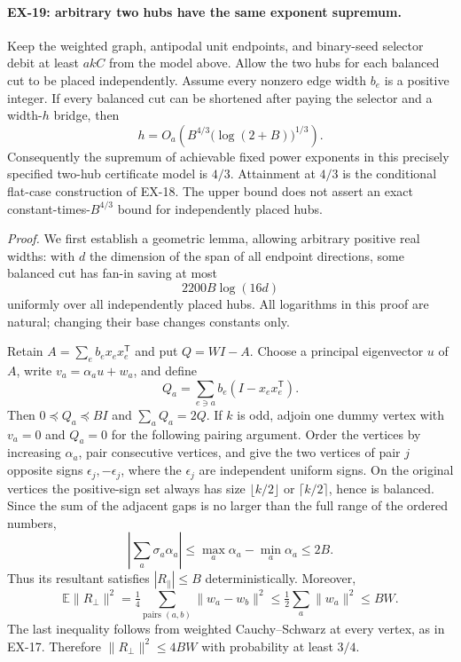 \paragraph{EX-19: arbitrary two hubs have the same exponent supremum.}
Keep the weighted graph, antipodal unit endpoints, and binary-seed selector
debit at least $akC$ from the model above.  Allow the two hubs for each
balanced cut to be placed independently.  Assume every nonzero edge width
$b_e$ is a positive integer.  If every balanced cut can be shortened after
paying the selector and a width-$h$ bridge, then
\[
 h=O_a\!\left(B^{4/3}\bigl(\log(2+B)\bigr)^{1/3}\right).
\]
Consequently the supremum of achievable fixed power exponents in this
precisely specified two-hub certificate model is $4/3$.  Attainment at
$4/3$ is the conditional flat-case construction of EX-18.  The upper bound
does not assert an exact constant-times-$B^{4/3}$ bound for independently
placed hubs.

\emph{Proof.}
We first establish a geometric lemma, allowing arbitrary positive real
widths: with $d$ the dimension of the span of all endpoint directions, some
balanced cut has fan-in saving at most
\[
 2200B\log(16d)
\]
uniformly over all independently placed hubs.  All logarithms in this
proof are natural; changing their base changes constants only.

Retain $A=\sum_e b_ex_ex_e^{\mathsf T}$ and put $Q=WI-A$.
Choose a principal eigenvector $u$ of $A$, write
$v_a=\alpha_a u+w_a$, and define
\[
 Q_a=\sum_{e\ni a}b_e(I-x_ex_e^{\mathsf T}).
\]
Then $0\preceq Q_a\preceq BI$ and $\sum_aQ_a=2Q$.
If $k$ is odd, adjoin one dummy vertex with $v_a=0$ and $Q_a=0$ for the
following pairing argument.  Order the vertices by increasing $\alpha_a$,
pair consecutive vertices, and give the two vertices of pair $j$
opposite signs $\epsilon_j,-\epsilon_j$, where the $\epsilon_j$ are
independent uniform signs.  On the original vertices the positive-sign
set always has size $\lfloor k/2\rfloor$ or $\lceil k/2\rceil$, hence is
balanced.  Since the sum of the adjacent gaps is no larger than the full
range of the ordered numbers,
\[
 \left|\sum_a\sigma_a\alpha_a\right|\leq
       \max_a\alpha_a-\min_a\alpha_a\leq2B.
\]
Thus its resultant satisfies $|R_\parallel|\leq B$ deterministically.
Moreover,
\[
 \mathbb E\|R_\perp\|^2
 =\tfrac14\sum_{\text{pairs }(a,b)}\|w_a-w_b\|^2
 \leq\tfrac12\sum_a\|w_a\|^2
 \leq BW.
\]
The last inequality follows from weighted Cauchy--Schwarz at every vertex,
as in EX-17.  Therefore
$\|R_\perp\|^2\leq4BW$ with probability at least $3/4$.

